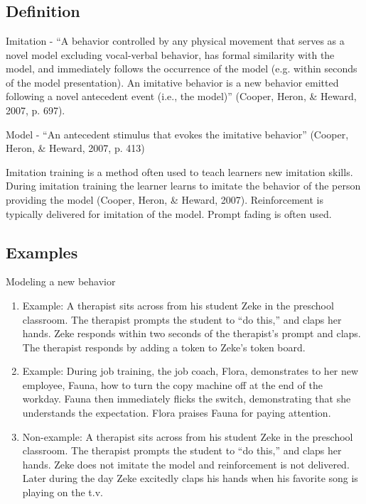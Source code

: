 \clearpage \section{\fourdFour{}}
\subsection{Definition}
Imitation - ``A behavior controlled by any physical movement that serves as a novel model excluding vocal-verbal behavior, has formal similarity with the model, and immediately follows the occurrence of the model (e.g. within seconds of the model presentation).  An imitative behavior is a new behavior emitted following a novel antecedent event (i.e., the model)'' (Cooper, Heron, \& Heward, 2007, p. 697).

Model - ``An antecedent stimulus that evokes the imitative behavior'' (Cooper, Heron, \& Heward, 2007, p. 413)

Imitation training is a method often used to teach learners new imitation skills.  During imitation training the learner learns to imitate the behavior of the person providing the model (Cooper, Heron, \& Heward, 2007). Reinforcement is typically delivered for imitation of the model. Prompt fading is often used.  

\subsection{Examples} Modeling a new behavior
\begin{enumerate}
\item Example: A therapist sits across from his student Zeke in the preschool classroom.  The therapist prompts the student to ``do this,'' and claps her hands.  Zeke responds within two seconds of the therapist's prompt and claps.  The therapist responds by adding a token to Zeke's token board.
\item Example:  During job training, the job coach, Flora, demonstrates to her new employee, Fauna, how to turn the copy machine off at the end of the workday.  Fauna then immediately flicks the switch, demonstrating that she understands the expectation.  Flora praises Fauna for paying attention.  
\item Non-example: A therapist sits across from his student Zeke in the preschool classroom.  The therapist prompts the student to ``do this,'' and claps her hands.  Zeke does not imitate the model and reinforcement is not delivered.  Later during the day Zeke excitedly claps his hands when his favorite song is playing on the t.v.
\end{enumerate}
%
